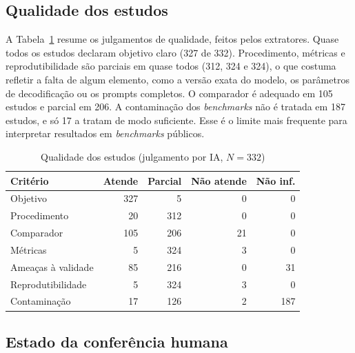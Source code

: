 



\subsection{Qualidade dos estudos}\label{sec:qualidade}
A Tabela~\ref{tab:qualidade} resume os julgamentos de qualidade, feitos pelos extratores. Quase todos os estudos
declaram objetivo claro (327 de 332). Procedimento, métricas e reprodutibilidade são parciais em quase todos (312,
324 e 324), o que costuma refletir a falta de algum elemento, como a versão exata do modelo, os parâmetros de
decodificação ou os prompts completos. O comparador é adequado em 105 estudos e parcial em 206. A contaminação dos
\textit{benchmarks} não é tratada em 187 estudos, e só 17 a tratam de modo suficiente. Esse é o limite mais
frequente para interpretar resultados em \textit{benchmarks} públicos.

\begin{table}[!t]
\caption{Qualidade dos estudos (julgamento por IA, $N = 332$)}\label{tab:qualidade}
\centering\footnotesize
\begin{tabular}{@{}lrrrr@{}}
\hline
Critério & Atende & Parcial & Não atende & Não inf.\\
\hline
Objetivo & 327 & 5 & 0 & 0\\
Procedimento & 20 & 312 & 0 & 0\\
Comparador & 105 & 206 & 21 & 0\\
Métricas & 5 & 324 & 3 & 0\\
Ameaças à validade & 85 & 216 & 0 & 31\\
Reprodutibilidade & 5 & 324 & 3 & 0\\
Contaminação & 17 & 126 & 2 & 187\\
\hline
\end{tabular}
\end{table}




\subsection{Estado da conferência humana}\label{sec:conferencia}

